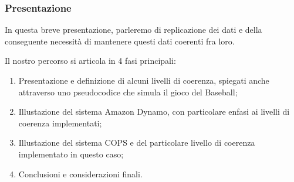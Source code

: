 \begin{frame}
\frametitle{Presentazione}
In questa breve presentazione, parleremo di replicazione dei dati
e della conseguente necessità di mantenere questi dati coerenti fra loro.

Il nostro percorso si articola in 4 fasi principali:
\begin{enumerate}
	\item Presentazione e definizione di alcuni livelli di coerenza,
		  spiegati anche attraverso uno pseudocodice che simula il gioco del Baseball;
	\item Illustazione del sistema Amazon Dynamo, con particolare enfasi ai
		  livelli di coerenza implementati;
	\item Illustazione del sistema COPS e del particolare livello di coerenza
		  implementato in questo caso;
	\item Conclusioni e considerazioni finali.
\end{enumerate}
\end{frame}